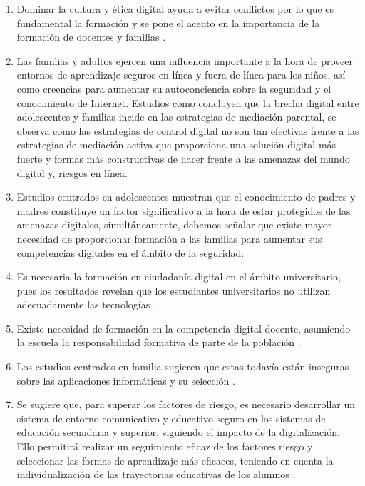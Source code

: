 \documentclass[spanish]{textolivre}
\begin{document}
\begin{enumerate}
    \item Dominar la cultura y ética digital ayuda a evitar conflictos por lo que es fundamental la formación y se pone el acento en la importancia de la formación de docentes y familias \cite{isrokatun2022digital}.
    \item Las familias y adultos ejercen una influencia importante a la hora de proveer entornos de aprendizaje seguros en línea y fuera de línea para los niños, así como creencias para aumentar su autoconciencia sobre la seguridad y el conocimiento de Internet. Estudios como \textcite{soldatova2020digital} concluyen que la brecha digital entre adolescentes y familias incide en las estrategias de mediación parental, se observa como las estrategias de control digital no son tan efectivas frente a las estrategias de mediación activa que proporciona una solución digital más fuerte y formas más constructivas de hacer frente a las amenazas del mundo digital y, riesgos en línea.
    \item Estudios centrados en adolescentes \cite{tomczyk_parents_2017} muestran que el conocimiento de padres y madres constituye un factor significativo a la hora de estar protegidos de las amenazas digitales, simultáneamente, debemos señalar que existe mayor necesidad de proporcionar formación a las familias para aumentar sus competencias digitales en el ámbito de la seguridad.
    \item Es necesaria la formación en ciudadanía digital en el ámbito universitario, pues los resultados revelan que los estudiantes universitarios no utilizan adecuadamente las tecnologías \cite{ogegbo2021assessment,takavarasha2018navigating}.
    \item Existe necesidad de formación en la competencia digital docente, asumiendo la escuela la responsabilidad formativa de parte de la población \cite{torres2022indicators}.
    \item Los estudios centrados en familia sugieren que estas todavía están inseguras sobre las aplicaciones informáticas y su selección \cite{mark2021invitation,schlebbe2018selecting}.
    \item Se sugiere que, para superar los factores de riesgo, es necesario desarrollar un sistema de entorno comunicativo y educativo seguro en los sistemas de educación secundaria y superior, siguiendo el impacto de la digitalización. Ello permitirá realizar un seguimiento eficaz de los factores riesgo y seleccionar las formas de aprendizaje más eficaces, teniendo en cuenta la individualización de las trayectorias educativas de los alumnos \cite{baeva2020safety,kaban2020secure}.

\end{enumerate}
\end{document}
